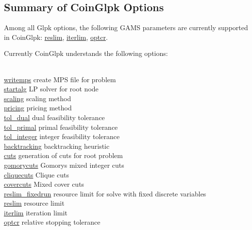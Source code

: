 \subsection{Summary of CoinGlpk Options}

Among all Glpk options, the following GAMS parameters are currently supported in CoinGlpk:
\hyperlink{glpkreslim}{reslim}, \hyperlink{glpkiterlim}{iterlim}, \hyperlink{glpkoptcr}{optcr}.

Currently CoinGlpk understands the following options:
\begin{tabbing}
\hspace {1.0in} \= \\
\hyperlink{glpkwritemps}
{writemps} \> create MPS file for problem \\
\hyperlink{glpkstartalg}
{startalg} \> LP solver for root node \\
\hyperlink{glpkscaling}
{scaling} \> scaling method \\
\hyperlink{pricing}
{pricing} \> pricing method \\
\hyperlink{glpktol_dual}
{tol\_dual} \> dual feasibility tolerance \\
\hyperlink{glpktol_primal}
{tol\_primal} \> primal feasibility tolerance \\
\hyperlink{glpktol_integer}
{tol\_integer} \> integer feasibility tolerance \\
\hyperlink{backtracking}
{backtracking} \> backtracking heuristic \\
\hyperlink{glpkcuts}
{cuts} \> generation of cuts for root problem \\
\hyperlink{glpkgomorycuts}
{gomorycuts} \> Gomorys mixed integer cuts \\
\hyperlink{glpkcliquecuts}
{cliquecuts} \> Clique cuts \\
\hyperlink{glpkcovercuts}
{covercuts} \> Mixed cover cuts \\
\hyperlink{reslim_fixedrun}
{reslim\_fixedrun} \> resource limit for solve with fixed discrete variables \\
\hyperlink{glpkreslim}
{reslim} \> resource limit \\
\hyperlink{glpkiterlim}
{iterlim} \> iteration limit \\
\hyperlink{glpkoptcr}
{optcr} \> relative stopping tolerance \\
\end{tabbing}

